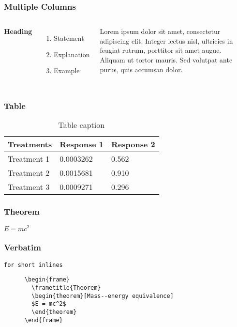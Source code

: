 \documentclass{beamer}
\begin{document}

\begin{frame}
\frametitle{Multiple Columns}
\begin{columns}[c] %

\textbf{Heading}
\begin{enumerate}
\item Statement
\item Explanation
\item Example
\end{enumerate}

Lorem ipsum dolor sit amet, consectetur adipiscing elit. Integer lectus nisl, ultricies in feugiat rutrum, porttitor sit amet augue. Aliquam ut tortor mauris. Sed volutpat ante purus, quis accumsan dolor.

\end{columns}
\end{frame}

\begin{frame}
\frametitle{Table}
\begin{table}
\begin{tabular}{l l l}
\toprule
\textbf{Treatments} & \textbf{Response 1} & \textbf{Response 2}\\
\midrule
Treatment 1 & 0.0003262 & 0.562 \\
Treatment 2 & 0.0015681 & 0.910 \\
Treatment 3 & 0.0009271 & 0.296 \\
\bottomrule
\end{tabular}
\caption{Table caption}
\end{table}
\end{frame}


\begin{frame}
\frametitle{Theorem}
\begin{theorem}
$E = mc^2$
\end{theorem}
\end{frame}


\begin{frame}[fragile] %
\frametitle{Verbatim}
  \verb.for short inlines.
  \begin{example}
    \begin{verbatim}
      \begin{frame}
        \frametitle{Theorem}
        \begin{theorem}[Mass--energy equivalence]
        $E = mc^2$
        \end{theorem}
      \end{frame}
    \end{verbatim}
  \end{example}
\end{frame}
\end{document}
